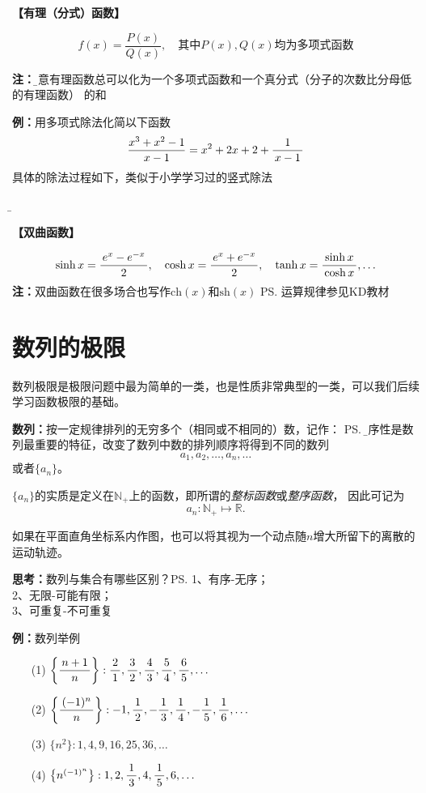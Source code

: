 {\bf 【有理（分式）函数】}

$$f(x)=\frac{P(x)}{Q(x)}, \quad\mbox{其中}P(x),Q(x)\mbox{均为多项式函数}$$
  
{\bf 注：}{\b 任意有理函数总可以化为一个多项式函数和一个真分式（分子的次数比分母低的有理函数）
的和}
	  
{{\bf 例：}用多项式除法化简以下函数}
$$\frac{x^3+x^2-1}{x-1}=x^2+2x+2+\displaystyle\frac{\,{1}\,}{\,{x-1}\,}$$
具体的除法过程如下，类似于小学学习过的竖式除法
\begin{center}
	{\b {}}
\end{center}

{\bf 【双曲函数】}

{\small $$\sinh x =\displaystyle\frac{\,{e^x-e^{-x}}\,}{\,{2}\,}, \quad
\cosh x =\displaystyle\frac{\,{e^x+e^{-x}}\,}{\,{2}\,}, \quad\tanh x=\displaystyle\frac{\,{\sinh
x}\,}{\,{\cosh x}\,}, \ldots$$}
{\bf 注：}双曲函数在很多场合也写作$\mathrm{ch}(x)$和$\mathrm{sh}(x)$
\ps{运算规律参见KD教材}

\section{数列的极限}

数列极限是极限问题中最为简单的一类，也是性质非常典型的一类，可以我们后续学习函数极限的基础。

{\bf 数列：}按一定规律排列的无穷多个（相同或不相同的）数，记作：
\ps{\b 有序性是数列最重要的特征，改变了数列中数的排列顺序将得到不同的数列}
$$a_1,a_2,\ldots,a_n,\ldots$$
或者$\{a_n\}$。

$\{a_n\}$的实质是定义在$\mathbb{N}_+$上的函数，即所谓的{\it 整标函数}或{\it 整序函数}，
因此可记为
$$a_n:\mathbb{N}_+\mapsto\mathbb{R}.$$

如果在平面直角坐标系内作图，也可以将其视为一个动点随$n$增大所留下的离散的运动轨迹。

{\bf 思考：}数列与集合有哪些区别？\ps{1、有序-无序；\\ 2、无限-可能有限；\\ 3、可重复-不可重复}

{\bf 例：}数列举例

\begin{enumerate}[(1)]
  \setlength{\itemindent}{1cm}
  \item[(1)] $\left\{\displaystyle\frac{\,{n+1}\,}{\,{n}\,}\right\}:\displaystyle\frac{\,{2}\,}{\,{1}\,},\displaystyle\frac{\,{3}\,}{\,{2}\,},\displaystyle\frac{\,{4}\,}{\,{3}\,},\displaystyle\frac{\,{5}\,}{\,{4}\,},\displaystyle\frac{\,{6}\,}{\,{5}\,},\ldots$
  \item[(2)] $\left\{\displaystyle\frac{\,{(-1)^n}\,}{\,{n}\,}\right\}:-1,\displaystyle\frac{\,{1}\,}{\,{2}\,},-\displaystyle\frac{\,{1}\,}{\,{3}\,},\displaystyle\frac{\,{1}\,}{\,{4}\,},-\displaystyle\frac{\,{1}\,}{\,{5}\,},\displaystyle\frac{\,{1}\,}{\,{6}\,},\ldots$
  \item[(3)] $\{n^2\}:1,4,9,16,25,36,\ldots$
  \item[(4)] $\left\{n^{(-1)^n}\right\}:1,2,\displaystyle\frac{\,{1}\,}{\,{3}\,},4,\displaystyle\frac{\,{1}\,}{\,{5}\,},6,\ldots$
\end{enumerate}

